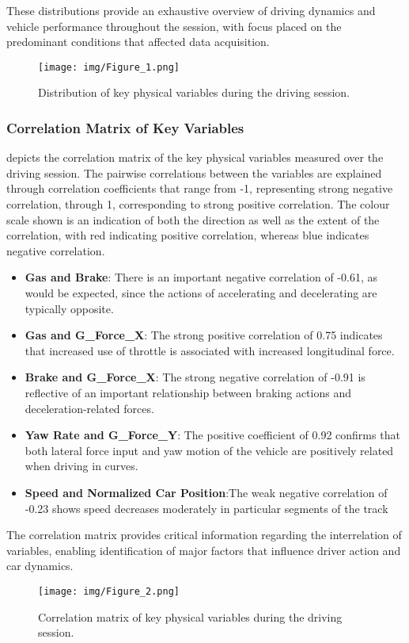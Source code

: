 \documentclass[a4paper,final,12pt]{report}
\begin{document}
These distributions provide an exhaustive overview of driving dynamics and vehicle performance throughout the session, with focus placed on the predominant conditions that affected data acquisition.

\begin{figure}[H]
    \centering
    \texttt{[image: img/Figure\_1.png]}
    \caption{Distribution of key physical variables during the driving session.}
    \label{fig:physical_variables_distribution}
\end{figure}

\subsubsection{Correlation Matrix of Key Variables}
depicts the correlation matrix of the key physical variables measured over the driving session. The pairwise correlations between the variables are explained through correlation coefficients that range from -1, representing strong negative correlation, through 1, corresponding to strong positive correlation. The colour scale shown is an indication of both the direction as well as the extent of the correlation, with red indicating positive correlation, whereas blue indicates negative correlation.

\begin{itemize}
    \item \textbf{Gas and Brake}: There is an important negative correlation of -0.61, as would be expected, since the actions of accelerating and decelerating are typically opposite.
    \item \textbf{Gas and G\_Force\_X}: The strong positive correlation of 0.75 indicates that increased use of throttle is associated with increased longitudinal force.
    \item \textbf{Brake and G\_Force\_X}: The strong negative correlation of -0.91 is reflective of an important relationship between braking actions and deceleration-related forces.
    \item \textbf{Yaw Rate and G\_Force\_Y}: The positive coefficient of 0.92 confirms that both lateral force input and yaw motion of the vehicle are positively related when driving in curves.
    \item \textbf{Speed and Normalized Car Position}:The weak negative correlation of -0.23 shows speed decreases moderately in particular segments of the track
\end{itemize}

The correlation matrix provides critical information regarding the interrelation of variables, enabling identification of major factors that influence driver action and car dynamics.
\begin{figure}[H]
    \centering
    \texttt{[image: img/Figure\_2.png]}
    \caption{Correlation matrix of key physical variables during the driving session.}
    \label{fig:correlation_matrix}
\end{figure}
\end{document}
